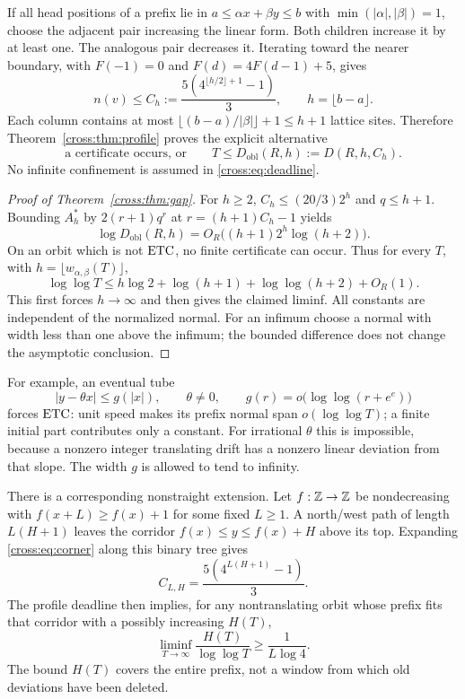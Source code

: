 If all head positions of a prefix lie in $a\le\alpha x+\beta y\le b$ with
$\min(|\alpha|,|\beta|)=1$, choose the adjacent pair increasing the linear form.
Both children increase it by at least one. The analogous pair decreases it.
Iterating toward the nearer boundary, with $F(-1)=0$ and $F(d)=4F(d-1)+5$, gives
\[
 n(v)\le C_h:=\frac{5(4^{\lfloor h/2\rfloor+1}-1)}3,
 \qquad h=\lfloor b-a\rfloor.
\]
Each column contains at most $\lfloor(b-a)/|\beta|\rfloor+1\le h+1$ lattice
sites. Therefore Theorem~\ref{cross:thm:profile} proves the explicit alternative
\begin{equation}
 \text{a certificate occurs, or}\qquad
 T\le D_{\mathrm{obl}}(R,h):=D(R,h,C_h).\label{cross:eq:deadline}
\end{equation}
No infinite confinement is assumed in \eqref{cross:eq:deadline}.

\begin{proof}[Proof of Theorem~\ref{cross:thm:gap}]
For $h\ge2$, $C_h\le(20/3)2^h$ and $q\le h+1$. Bounding $A_h^*$ by
$2(r+1)q^r$ at $r=(h+1)C_h-1$ yields
\[
 \log D_{\mathrm{obl}}(R,h)
 =O_R\bigl((h+1)2^h\log(h+2)\bigr).
\]
On an orbit which is not $\mathrm{ETC}$, no finite certificate can occur. Thus for every
$T$, with $h=\lfloor w_{\alpha,\beta}(T)\rfloor$,
\[
 \log\log T\le h\log2+\log(h+1)+\log\log(h+2)+O_R(1).
\]
This first forces $h\to\infty$ and then gives the claimed liminf. All constants
are independent of the normalized normal. For an infimum choose a normal with
width less than one above the infimum; the bounded difference does not change
the asymptotic conclusion.
\end{proof}

For example, an eventual tube
\[
 |y-\theta x|\le g(|x|),\qquad \theta\ne0,
 \qquad g(r)=o\bigl(\log\log(r+e^e)\bigr)
\]
forces $\mathrm{ETC}$: unit speed makes its prefix normal span $o(\log\log T)$; a finite
initial part contributes only a constant. For irrational $\theta$ this is
impossible, because a nonzero integer translating drift has a nonzero linear
deviation from that slope. The width $g$ is allowed to tend to infinity.

There is a corresponding nonstraight extension. Let $f:\mathbb Z\to\mathbb Z$ be
nondecreasing with $f(x+L)\ge f(x)+1$ for some fixed $L\ge1$. A north/west path
of length $L(H+1)$ leaves the corridor $f(x)\le y\le f(x)+H$ above its top.
Expanding \eqref{cross:eq:corner} along this binary tree gives
\[
 C_{L,H}=\frac{5(4^{L(H+1)}-1)}3.
\]
The profile deadline then implies, for any nontranslating orbit whose prefix
fits that corridor with a possibly increasing $H(T)$,
\[
 \liminf_{T\to\infty}\frac{H(T)}{\log\log T}\ge\frac1{L\log4}.
\]
The bound $H(T)$ covers the entire prefix, not a window from which old deviations
have been deleted.

